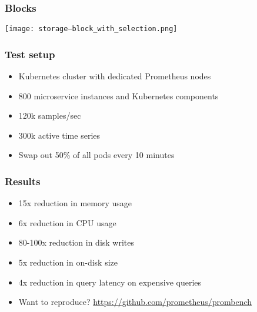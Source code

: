 \documentclass[t]{beamer}
\begin{document}
\begin{frame}
	\frametitle{Blocks}
	\texttt{[image: storage--block\_with\_selection.png]}
\end{frame}


\begin{frame}
	\frametitle{Test setup}
	\begin{itemize}
		\item Kubernetes cluster with dedicated Prometheus nodes
		\item 800 microservice instances and Kubernetes components
		\item 120k samples/sec
		\item 300k active time series
		\item Swap out 50\% of all pods every 10 minutes
	\end{itemize}
\end{frame}

\begin{frame}
	\frametitle{Results}
	\begin{itemize}
		\item 15x reduction in memory usage
		\item 6x reduction in CPU usage
		\item 80-100x reduction in disk writes
		\item 5x reduction in on-disk size
		\item 4x reduction in query latency on expensive queries
		\item Want to reproduce? \url{https://github.com/prometheus/prombench}
	\end{itemize}
\end{frame}

\end{document}
